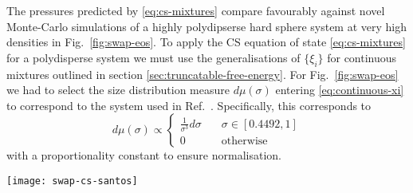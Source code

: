 The pressures predicted by \eqref{eq:cs-mixtures} compare favourably against novel Monte-Carlo simulations of a highly polydipserse hard sphere system \cite{BerthierPRL2016} at very high densities in Fig.\ \ref{fig:swap-eos}.
To apply the CS equation of state \eqref{eq:cs-mixtures} for a polydisperse system we must use the generalisations of $\{\xi_i\}$ for continuous mixtures outlined in section \ref{sec:truncatable-free-energy}.
For Fig.\ \ref{fig:swap-eos} we had to select the size distribution measure $d\mu(\sigma)$ entering \eqref{eq:continuous-xi} to correspond to the system used in Ref.\ \cite{BerthierPRL2016}.
Specifically, this corresponds to
\begin{equation}\label{eq:berthier-size-measure}
  d\mu(\sigma)
  \propto
  \begin{cases}
    \frac{1}{\sigma^3} d\sigma \quad & \sigma \in [0.4492, 1]
    \\
    0 & \textrm{otherwise}
  \end{cases}
\end{equation}
with a proportionality constant to ensure normalisation.

\begin{SCfigure}
  \texttt{[image: swap-cs-santos]}
  \caption[Accuracy of Carnahan-Starling equation at high densities]{
    Accuracy of empirical Carnahan-Starling (CS) equation of state \eqref{eq:cs-mixtures} in the supercooled regime from comparison with novel Monte-Carlo (MC) simulations for a system with 23\% polydispersity.
    The size distribution of this system is described by \eqref{eq:berthier-size-measure}.
    The range of jamming volume fractions $\eta_J$ from non-equilibrium compression protocols with this system are indicated by the blue region.
    Simulation data and jamming densities reproduced from Ref.\ \cite{BerthierPRL2016}.
  }
  \label{fig:swap-eos}
\end{SCfigure}

